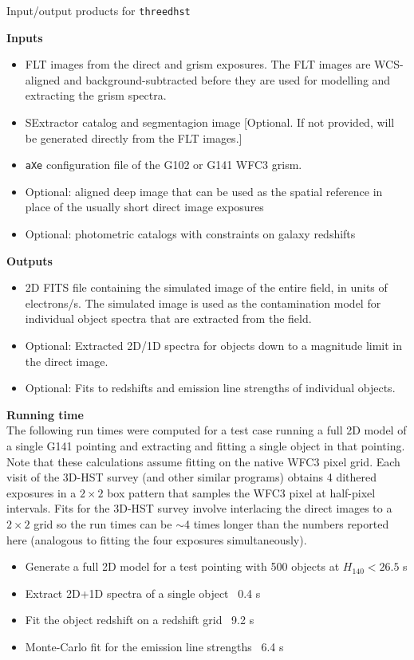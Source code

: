 \documentclass[12pt]{article}
\begin{document}
\centerline{Input/output products for \texttt{threedhst}}
\noindent \textbf{Inputs}
\begin{itemize}
\item  FLT images from the direct and grism exposures.  The FLT images are WCS-aligned and background-subtracted before they are used for modelling and extracting the grism spectra.
\item SExtractor catalog and segmentagion image [Optional.  If not provided, will be generated directly from the FLT images.]
\item \texttt{aXe} configuration file of the G102 or G141 WFC3 grism.
\item Optional: aligned deep image that can be used as the spatial reference in place of the usually short direct image exposures
\item Optional: photometric catalogs with constraints on galaxy redshifts
\end{itemize}
\textbf{Outputs}
\begin{itemize}
\item 2D FITS file containing the simulated image of the entire field, in units of electrons/s.  The simulated image is used as the contamination model for individual object spectra that are extracted from the field.
\item Optional: Extracted 2D/1D spectra for objects down to a magnitude limit in the direct image.
\item Optional: Fits to redshifts and emission line strengths of individual objects.
\end{itemize}
\textbf{Running time} \\
The following run times were computed for a test case running a full 2D model of a single G141 pointing and extracting and fitting a single object in that pointing.  Note that these calculations assume fitting on the native WFC3 pixel grid.  Each visit of the 3D-HST survey (and other similar programs) obtains 4 dithered exposures in a $2\times2$ box pattern that samples the WFC3 pixel at half-pixel intervals.  Fits for the 3D-HST survey involve interlacing the direct images to a $2\times2$ grid so the run times can be $\sim$4 times longer than the numbers reported here (analogous to fitting the four exposures simultaneously).
\begin{itemize}
\item Generate a full 2D model for a test pointing with 500 objects at $H_{140} < 26.5$  s
\item Extract 2D+1D spectra of a single object \dotfill\ 0.4 s
\item Fit the object redshift on a redshift grid \dotfill\ 9.2 s
\item Monte-Carlo fit for the emission line strengths \dotfill\ 6.4 s
\end{itemize}
\end{document}
